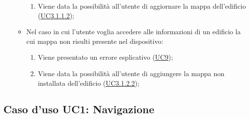 \documentclass[../AnalisiDeiRequisiti.tex]{subfiles}
\begin{document}
\begin{itemize}
\begin{itemize}
\begin{enumerate}
			\item Viene data la possibilità all'utente di aggiornare la mappa dell'edificio (\hyperlink{UC3.1.1.2}{UC3.1.1.2});
		\end{enumerate}
		\item Nel caso in cui l'utente voglia accedere alle informazioni di un edificio la cui mappa non risulti presente nel dispositivo: 
		\begin{enumerate}
			\item Viene presentato un errore esplicativo (\hyperlink{UC9}{UC9});
			\item Viene data la possibilità all'utente di aggiungere la mappa non installata dell'edificio (\hyperlink{UC3.1.2.2}{UC3.1.2.2});
		\end{enumerate}
	\end{itemize}
\end{itemize}
\hypertarget{UC1}{}
\subsection{Caso d'uso UC1: Navigazione}
\end{document}
